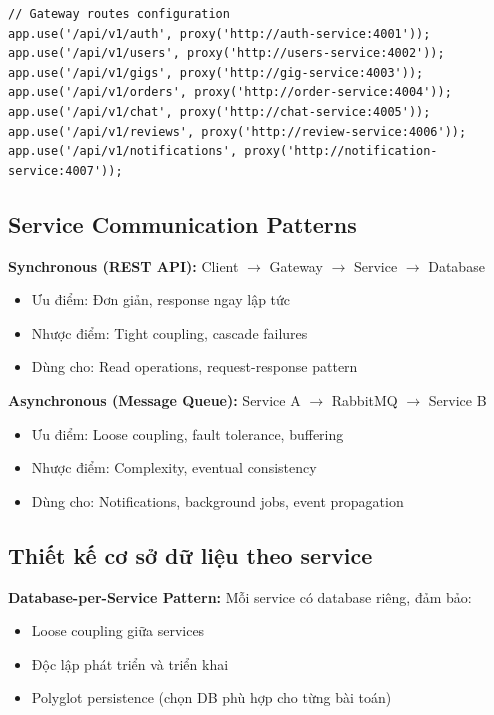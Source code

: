 \documentclass[12pt]{extreport}
\begin{document}
\begin{lstlisting}[style=TypeScriptStyle, caption={Gateway Routing}]
// Gateway routes configuration
app.use('/api/v1/auth', proxy('http://auth-service:4001'));
app.use('/api/v1/users', proxy('http://users-service:4002'));
app.use('/api/v1/gigs', proxy('http://gig-service:4003'));
app.use('/api/v1/orders', proxy('http://order-service:4004'));
app.use('/api/v1/chat', proxy('http://chat-service:4005'));
app.use('/api/v1/reviews', proxy('http://review-service:4006'));
app.use('/api/v1/notifications', proxy('http://notification-service:4007'));
\end{lstlisting}

\subsection{Service Communication Patterns}

\textbf{Synchronous (REST API):} Client $\rightarrow$ Gateway $\rightarrow$ Service $\rightarrow$ Database
\begin{itemize}
    \item Ưu điểm: Đơn giản, response ngay lập tức
    \item Nhược điểm: Tight coupling, cascade failures
    \item Dùng cho: Read operations, request-response pattern
\end{itemize}

\textbf{Asynchronous (Message Queue):} Service A $\rightarrow$ RabbitMQ $\rightarrow$ Service B
\begin{itemize}
    \item Ưu điểm: Loose coupling, fault tolerance, buffering
    \item Nhược điểm: Complexity, eventual consistency
    \item Dùng cho: Notifications, background jobs, event propagation
\end{itemize}

\subsection{Thiết kế cơ sở dữ liệu theo service}

\textbf{Database-per-Service Pattern:} Mỗi service có database riêng, đảm bảo:
\begin{itemize}
    \item Loose coupling giữa services
    \item Độc lập phát triển và triển khai
    \item Polyglot persistence (chọn DB phù hợp cho từng bài toán)
\end{itemize}
\end{document}
